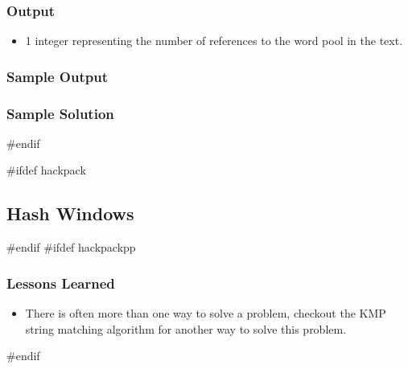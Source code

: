 \subsubsection{Output}
\begin{itemize}
	\item 1 integer representing the number of references to the word pool in the text.
\end{itemize}

\subsubsection{Sample Output}

\subsubsection{Sample Solution}
#endif

#ifdef hackpack
\subsection{Hash Windows}
#endif
#ifdef hackpackpp
\subsubsection{Lessons Learned}
\begin{itemize}
	\item There is often more than one way to solve a problem, checkout the KMP string matching algorithm for another way to solve this problem.
\end{itemize}
#endif

